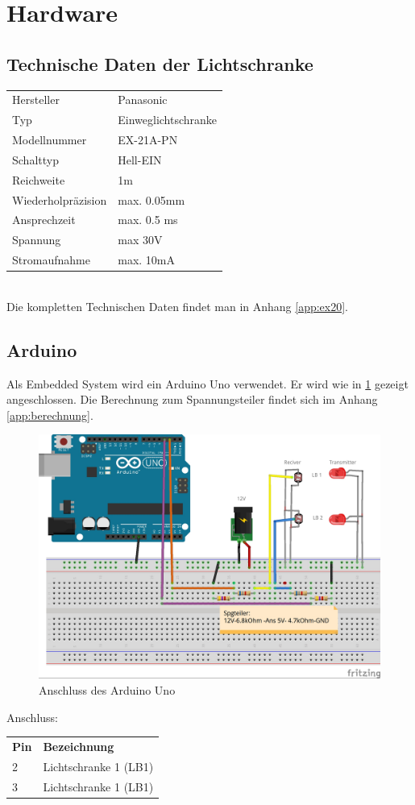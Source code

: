 \section{Hardware}
\subsection{Technische Daten der Lichtschranke}
\null{}
\begin{tabular}{ll}
    Hersteller & Panasonic\\
    Typ & Einweglichtschranke\\
    Modellnummer &  EX-21A-PN \\
    Schalttyp & Hell-EIN\\
    Reichweite & 1m\\
    Wiederholpräzision & max. 0.05mm\\
    Ansprechzeit & max. 0.5 ms\\
    Spannung & max 30V\\
    Stromaufnahme & max. 10mA
\end{tabular}
\\
Die kompletten Technischen Daten findet man in Anhang \ref{app:ex20}.

\subsection{Arduino}
Als  Embedded System wird ein Arduino Uno verwendet. Er wird wie in \ref{fig:ArdAns} gezeigt angeschlossen.  Die Berechnung zum Spannungsteiler findet sich im Anhang \ref{app:berechnung}.

\begin{figure}[ht]
    \centering
    	\includegraphics[width=\textwidth]{images/fritzing.jpg}
    \caption{Anschluss des Arduino Uno}
    \label{fig:ArdAns}
\end{figure}
Anschluss\enlargethispage{\baselineskip}:\newline
\begin{tabular}{ll}
    \textbf{Pin} & \textbf{Bezeichnung}\\
    2 & Lichtschranke 1 (LB1)\\
    3 & Lichtschranke 1 (LB1)\\
\end{tabular}